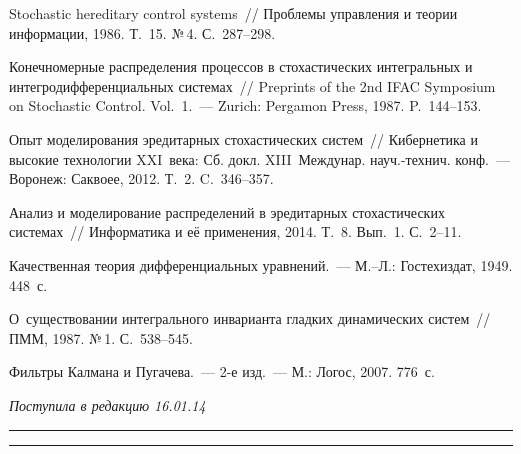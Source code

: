 \begin{multicols}{2}
{{\begin{thebibliography}{99}
Stochastic hereditary control systems~// Проблемы управления и
теории информации, 1986. Т.~15. №\,4. С.~287--298.

Конечномерные распределения процессов в стохастических интегральных
и интегродифференциальных системах~// Preprints of the 2nd IFAC
Symposium on Stochastic Control. Vol.~1.~--- Zurich: Pergamon Press,
1987. P.~144--153.


Опыт моделирования эредитарных стохастических систем~//
Кибернетика и высокие технологии XXI~века: Сб. докл.  XIII~Междунар.
на\-уч.-тех\-нич. конф.~--- Воронеж: Саквоее, 2012. Т.~2. C.~346--357.


Анализ и моделирование распределений в эредитарных стохастических
системах~// Информатика и её применения, 2014. Т.~8. Вып.~1.
С.~2--11.


Качественная теория дифференциальных уравнений.~--- М.--Л.: Гостехиздат,
1949. 448~с.

 О~существовании интегрального инварианта гладких
динамических систем~// ПММ, 1987. №\,1. С.~538--545.

 Фильтры Калмана и Пугачева.~--- 2-е изд.~--- М.: Логос,
2007. 776~с.


\end{thebibliography}
} }

\end{multicols}

\vspace*{-9pt}

\hfill{\small\textit{Поступила в редакцию 16.01.14}}



\vspace*{6pt}

\hrule

\vspace*{2pt}

\hrule

